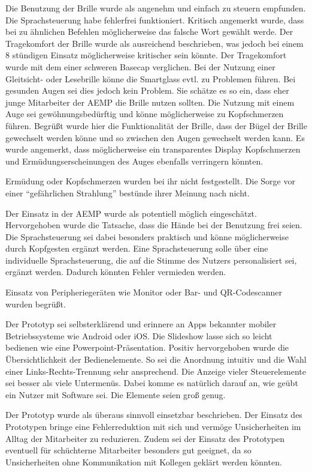 Die Benutzung der Brille wurde als angenehm und einfach zu steuern empfunden. Die Sprachsteuerung habe fehlerfrei funktioniert. Kritisch angemerkt wurde, dass bei zu ähnlichen Befehlen möglicherweise das falsche Wort gewählt werde. Der Tragekomfort der Brille wurde als ausreichend beschrieben, was jedoch bei einem 8 stündigen Einsatz möglicherweise kritischer sein könnte. Der Tragekomfort wurde mit dem einer schweren Basecap verglichen. Bei der Nutzung einer Gleitsicht- oder Lesebrille könne die Smartglass evtl. zu Problemen führen. Bei gesunden Augen sei dies jedoch kein Problem. Sie schätze es so ein, dass eher junge Mitarbeiter der AEMP die Brille nutzen sollten. Die Nutzung mit einem Auge sei gewöhnungsbedürftig und könne möglicherweise zu Kopfschmerzen führen. Begrüßt wurde hier die Funktionalität der Brille, dass der Bügel der Brille gewechselt werden könne und so zwischen den Augen gewechselt werden kann. Es wurde angemerkt, dass möglicherweise ein transparentes Display Kopfschmerzen und Ermüdungserscheinungen des Auges ebenfalls verringern könnten.

Ermüdung oder Kopfschmerzen wurden bei ihr nicht festgestellt. Die Sorge vor einer \enquote{gefährlichen Strahlung} bestünde ihrer Meinung nach nicht.

Der Einsatz in der AEMP wurde als potentiell möglich eingeschätzt. Hervorgehoben wurde die Tatsache, dass die Hände bei der Benutzung frei seien. Die Sprachsteuerung sei dabei besonders praktisch und könne möglicherweise durch Kopfgesten ergänzt werden. Eine Sprachsteuerung solle über eine individuelle Sprachsteuerung, die auf die Stimme des Nutzers personalisiert sei, ergänzt werden. Dadurch könnten Fehler vermieden werden.

Einsatz von Peripheriegeräten wie Monitor oder Bar- und QR-Codescanner wurden begrüßt.

Der Prototyp sei selbsterklärend und erinnere an Apps bekannter mobiler  Betriebssysteme wie Android oder iOS. Die Slideshow lasse sich so leicht bedienen wie eine Powerpoint-Präsentation. Positiv hervorgehoben wurde die Übersichtlichkeit der Bedienelemente. So sei die Anordnung intuitiv und die Wahl einer Links-Rechts-Trennung sehr ansprechend. Die Anzeige vieler Steuerelemente sei besser als viele Untermenüs. Dabei komme es natürlich darauf an, wie geübt ein Nutzer mit Software sei. Die Elemente seien groß genug. 

Der Prototyp wurde als überaus sinnvoll einsetzbar beschrieben. Der Einsatz des Prototypen bringe eine Fehlerreduktion mit sich und vermöge Unsicherheiten im Alltag der Mitarbeiter zu reduzieren. Zudem sei der Einsatz des Prototypen eventuell für schüchterne Mitarbeiter besonders gut geeignet, da so Unsicherheiten ohne Kommunikation mit Kollegen geklärt werden könnten.

